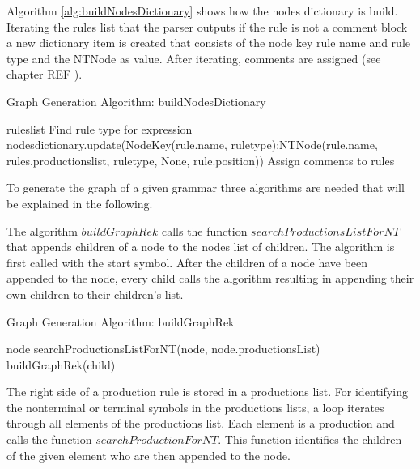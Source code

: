 Algorithm \ref{alg:buildNodesDictionary} shows how the nodes dictionary is build. Iterating the rules list that the parser outputs if the rule is not a comment block a new dictionary item is created that consists of the node key rule name and rule type and the NTNode as value. After iterating, comments are assigned (see chapter REF ).

\begin{algorithm}[H]
\caption{Graph Generation Algorithm: buildNodesDictionary}\label{alg:buildNodesDictionary}
\begin{algorithmic}[1] 
\Require rules\textunderscore list
		\State Find rule type for expression
		\State nodes\textunderscore dictionary.update({Node\textunderscore Key(rule.name, rule\textunderscore type):NTNode(rule.name, rules.productions\textunderscore list, rule\textunderscore type, None, rule.position)})
	\EndIf
\EndFor
\State Assign comments to rules
\end{algorithmic}
\end{algorithm}

To generate the graph of a given grammar three algorithms are needed that will be explained in the following.

The algorithm $buildGraphRek$ calls the function $searchProductionsListForNT$ that appends children of a node to the nodes list of children.
The algorithm is first called with the start symbol.
After the children of a node have been appended to the node, every child calls the algorithm resulting in appending their own children to their children's list.

\begin{algorithm}[H]
\caption{Graph Generation Algorithm: buildGraphRek}
\begin{algorithmic}[1] 
\Require node
\State searchProductionsListForNT(node, node.productionsList)
		\State buildGraphRek(child)
	\EndFor
\EndIf
\end{algorithmic}
\end{algorithm}

The right side of a production rule is stored in a productions list.
For identifying the nonterminal or terminal symbols in the productions lists, a loop iterates through all elements of the productions list.
Each element is a production and calls the function $searchProductionForNT$.
This function identifies the children of the given element who are then appended to the node.

